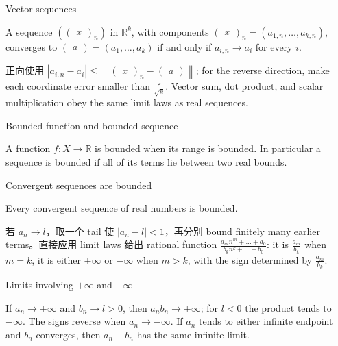 \begin{theorem}{Vector sequences}

A sequence \(\left( \begin{pmatrix}
x
\end{pmatrix}_{n} \right)\) in \(\mathbb{R}^{k}\), with components \(\begin{pmatrix}
x
\end{pmatrix}_{n} = \left( {a_{1,n},\ldots,a_{k,n}} \right)\), converges to \(\begin{pmatrix}
a
\end{pmatrix} = \left( {a_{1},\ldots,a_{k}} \right)\) if and only if \(a_{i,n}\rightarrow a_{i}\) for every \(i\).

\end{theorem}

正向使用 \(\left| {a_{i,n} - a_{i}} \right| \leq \left\| {\begin{pmatrix}
x
\end{pmatrix}_{n} - \begin{pmatrix}
a
\end{pmatrix}} \right\|\); for the reverse direction, make each coordinate error smaller than \(\frac{\varepsilon}{\sqrt{k}}\). Vector sum, dot product, and scalar multiplication obey the same limit laws as real sequences.

\begin{definition}{Bounded function and bounded sequence}

A function \(f:X\rightarrow\mathbb{R}\) is bounded when its range is bounded. In particular a sequence is bounded if all of its terms lie between two real bounds.

\end{definition}

\begin{theorem}{Convergent sequences are bounded}

Every convergent sequence of real numbers is bounded.

\end{theorem}

若 \(a_{n}\rightarrow l\)，取一个 tail 使 \(\left| {a_{n} - l} \right| < 1\)，再分别 bound finitely many earlier terms。直接应用 limit laws 给出 rational function \(\frac{a_{m}n^{m} + \ldots + a_{0}}{b_{k}n^{k} + \ldots + b_{0}}\): it is \(\frac{a_{m}}{b_{k}}\) when \(m = k\), it is either \(+ \infty\) or \(- \infty\) when \(m > k\), with the sign determined by \(\frac{a_{m}}{b_{k}}\).

\begin{theorem}{Limits involving \(+ \infty\) and \(- \infty\)}

If \(a_{n}\rightarrow + \infty\) and \(b_{n}\rightarrow l > 0\), then \(a_{n}b_{n}\rightarrow + \infty\); for \(l < 0\) the product tends to \(- \infty\). The signs reverse when \(a_{n}\rightarrow - \infty\). If \(a_{n}\) tends to either infinite endpoint and \(b_{n}\) converges, then \(a_{n} + b_{n}\) has the same infinite limit.

\end{theorem}

